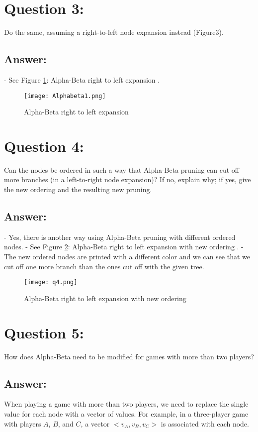 \documentclass[12pt, a4paper]{report}
\begin{document}
\section{Question 3:}
Do the same, assuming a right-to-left node expansion instead (Figure3).

\subsection{Answer:}
- See Figure \ref{fig3}: Alpha-Beta right to left expansion .

    \begin{figure}[h]
        \caption{Alpha-Beta right to left expansion}
        \label{fig3}
         \texttt{[image: Alphabeta1.png]}
    \end{figure}
    
\section{Question 4:}
Can the nodes be ordered in such a way that Alpha-Beta pruning can cut off more branches (in a left-to-right node expansion)? If no, explain why; if yes, give the new ordering and the resulting new pruning.

\subsection{Answer:}
- Yes, there is another way using Alpha-Beta pruning with different ordered nodes.
\newline
- See Figure \ref{fig4}: Alpha-Beta right to left expansion with new ordering .
\newline
- The new ordered nodes are printed with a different color and we can see that we cut off one more branch than the ones cut off with the given tree.  

    \begin{figure}[h]
        \caption{Alpha-Beta right to left expansion with new ordering}
        \label{fig4}
         \texttt{[image: q4.png]}
    \end{figure}
    
\section{Question 5:}
How does Alpha-Beta need to be modified for games with more than two players?

\subsection{Answer:}
When playing a game with more than two players, we need to replace the single value for each node with a vector of values. For example, in a three-player game with players $A$, $B$, and $C$, a vector $<v_A, v_B, v_C>$ is associated with each node. 
\end{document}
